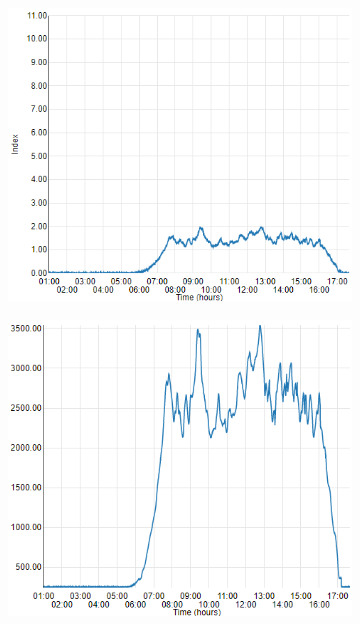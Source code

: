\documentclass{article}      %
\begin{document}
\begin{figure}[ht]
\begin{subfigure}[c]{0.5\textwidth}
\includegraphics[width=1\textwidth]{expEval/UV_09-02-2018.PNG}
\label{fig:evalUV}
\end{subfigure}
\begin{subfigure}[c]{0.5\textwidth}
\includegraphics[width=1\textwidth]{expEval/IR_09-02-2018.PNG}
\label{fig:evalIR}

\end{subfigure}
\end{figure}
\end{document}
